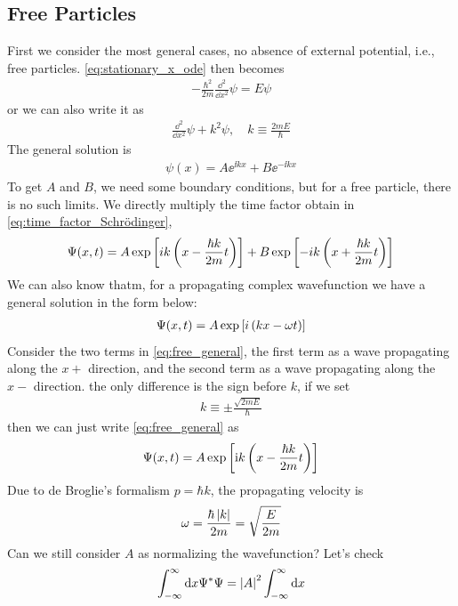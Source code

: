 \subsection{Free Particles}
First we consider the most general cases, no absence of external potential, i.e., free particles. \cref{eq:stationary_x_ode} then becomes 
\begin{eqnarray}
    -\frac{\hbar^2}{2m} \frac{\dd^2}{\dd x^2} \psi = E \psi
\end{eqnarray}
or we can also write it as 
\begin{eqnarray}
    \frac{\dd^2}{\dd x^2} \psi + k^2 \psi,\quad k \equiv \frac{2mE}{\hbar} \label{eq:scheq_k}
\end{eqnarray}
The general solution is 
\begin{eqnarray}
    \psi(x) = A \ee^{\ii k x} + B \ee^{- \ii k x}
\end{eqnarray}
To get $A$ and $B$, we need some boundary conditions, but for a free particle, there is no such limits. We directly multiply the time factor obtain in \cref{eq:time_factor_Schrödinger},
\begin{eqnarray}
    \Psi(x,t) = A \exp\left[ik\left(x - \frac{\hbar k}{2m}t\right)\right] + B \exp\left[-ik\left(x + \frac{\hbar k}{2m}t\right)\right] \label{eq:free_general}
\end{eqnarray}
We can also know thatm, for a propagating complex wavefunction we have a general solution in the form below: 
\begin{eqnarray}
    \Psi(x,t) = A \exp\left[i \left(kx - \omega t\right)\right]
\end{eqnarray}
Consider the two terms in \cref{eq:free_general}, the first term as a wave propagating along the $x+$ direction, and the second term as a wave propagating along the $x-$ direction. the only difference is the sign before $k$, if we set 
\begin{eqnarray}
    k \equiv \pm \frac{\sqrt{2 m E}}{\hbar}
\end{eqnarray}
then we can just write \cref{eq:free_general} as 
\begin{eqnarray}
    \Psi(x,t) = A \exp\left[\mathrm{i} k\left( x - \frac{\hbar k}{2m}t \right)\right]
\end{eqnarray}
Due to de Broglie's formalism $p = \hbar k$, the propagating velocity is 
\begin{eqnarray}
    \omega = \frac{\hbar \left| k \right|}{2m} = \sqrt{\frac{E}{2m}}
\end{eqnarray}
Can we still consider $A$ as normalizing the wavefunction? Let's check
\begin{eqnarray}
    \int_{-\infty}^{\infty} \mathrm{d} x \Psi^* \Psi = \left| A \right|^2 \int_{-\infty}^{\infty} \mathrm{d} x
\end{eqnarray}

